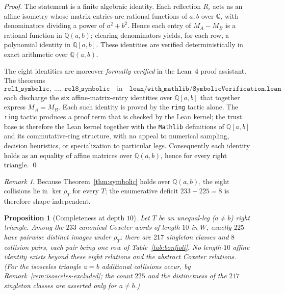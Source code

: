 \documentclass[11pt]{article}
\theoremstyle{plain}
\newtheorem{proposition}[theorem]{Proposition}
\theoremstyle{definition}
\theoremstyle{remark}
\newtheorem{remark}[theorem]{Remark}
\begin{document}
\begin{proof}
The statement is a finite algebraic identity. Each reflection $R_i$ acts as an
affine isometry whose matrix entries are rational functions of $a, b$ over
$\mathbb{Q}$, with denominators dividing a power of $a^2+b^2$. Hence each entry
of $M_A - M_B$ is a rational function in $\mathbb{Q}(a,b)$; clearing
denominators yields, for each row, a polynomial identity in $\mathbb{Q}[a,b]$.
These identities are verified deterministically in exact arithmetic over
$\mathbb{Q}(a,b)$.

The eight identities are moreover \emph{formally verified} in the Lean~4 proof
assistant. The theorems
\[
\texttt{rel1\_symbolic},\ \dots,\ \texttt{rel8\_symbolic} \quad\text{in}\quad
\texttt{lean/with\_mathlib/SymbolicVerification.lean}
\]
each discharge the six affine-matrix-entry identities over $\mathbb{Q}[a,b]$
that together express $M_A = M_B$. Each such identity is proved by the
\texttt{ring} tactic alone. The \texttt{ring} tactic produces a proof term that
is checked by the Lean kernel; the trust base is therefore the Lean kernel
together with the \texttt{Mathlib} definitions of $\mathbb{Q}[a,b]$ and its
commutative-ring structure, with no appeal to numerical sampling, decision
heuristics, or specialization to particular legs. Consequently each identity
holds as an equality of affine matrices over $\mathbb{Q}(a,b)$, hence for every
right triangle.
\qed
\end{proof}

\begin{remark}
Because Theorem~\ref{thm:symbolic} holds over $\mathbb{Q}(a,b)$, the eight
collisions lie in $\ker \rho_T$ for every $T$; the enumerative deficit
$233 - 225 = 8$ is therefore shape-independent.
\end{remark}

\begin{proposition}[Completeness at depth $10$]
\label{prop:bonfioli-completeness}
Let $T$ be an unequal-leg ($a \ne b$) right triangle. Among the $233$ canonical
Coxeter words of length $10$ in $W$, exactly $225$ have pairwise distinct images
under $\rho_T$: there are $217$ singleton classes and $8$ collision pairs, each
pair being one row of Table~\ref{tab:bonfioli}. No length-$10$ affine identity
exists beyond these eight relations and the abstract Coxeter relations. (For the
isosceles triangle $a = b$ additional collisions occur, by
Remark~\ref{rem:isosceles-excluded}; the count $225$ and the distinctness of the
$217$ singleton classes are asserted only for $a \ne b$.)
\end{proposition}
\end{document}
